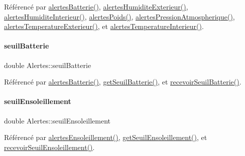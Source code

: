 Référencé par \hyperlink{class_alertes_ad708a4b800d56c1439b65d12a3c6b027}{alertes\+Batterie()}, \hyperlink{class_alertes_a8606946eaa04dfd29bb7951b2b850a04}{alertes\+Humidite\+Exterieur()}, \hyperlink{class_alertes_a7558cb097dc392547ceb12ab4d6cbd4c}{alertes\+Humidite\+Interieur()}, \hyperlink{class_alertes_ac4b8925cc6c262cf7254b1576ba07d33}{alertes\+Poids()}, \hyperlink{class_alertes_ab8a33e82cdd4d4e0560c9ba6e10ca8d5}{alertes\+Pression\+Atmospherique()}, \hyperlink{class_alertes_a91fb2665fa8b6c32c74bfe4d1b89a2d8}{alertes\+Temperature\+Exterieur()}, et \hyperlink{class_alertes_a8bc56cf9eb525624b2c1f5b20f86724b}{alertes\+Temperature\+Interieur()}.

\mbox{\label{class_alertes_a3ac4e5d2b1a8fdd9cf4633861948110f}} 
\paragraph{\texorpdfstring{seuil\+Batterie}{seuilBatterie}}
{\footnotesize\ttfamily double Alertes\+::seuil\+Batterie\hspace{0.3cm}{\ttfamily [private]}}



Référencé par \hyperlink{class_alertes_ad708a4b800d56c1439b65d12a3c6b027}{alertes\+Batterie()}, \hyperlink{class_alertes_adcf9f9fb707944ae17f2355819eb58d1}{get\+Seuil\+Batterie()}, et \hyperlink{class_alertes_a61e1f4a105bd64ac829959726ae6ebb8}{recevoir\+Seuil\+Batterie()}.

\mbox{\label{class_alertes_a7f512b6d3b5bc0851757ab4d18279ccf}} 
\paragraph{\texorpdfstring{seuil\+Ensoleillement}{seuilEnsoleillement}}
{\footnotesize\ttfamily double Alertes\+::seuil\+Ensoleillement\hspace{0.3cm}{\ttfamily [private]}}



Référencé par \hyperlink{class_alertes_ae7ad960c530a6a7e82df3ed55d159a68}{alertes\+Ensoleillement()}, \hyperlink{class_alertes_a54900058557979664d25137399ae2512}{get\+Seuil\+Ensoleillement()}, et \hyperlink{class_alertes_abf6b9934820f50024c50dc9691f4ddee}{recevoir\+Seuil\+Ensoleillement()}.

